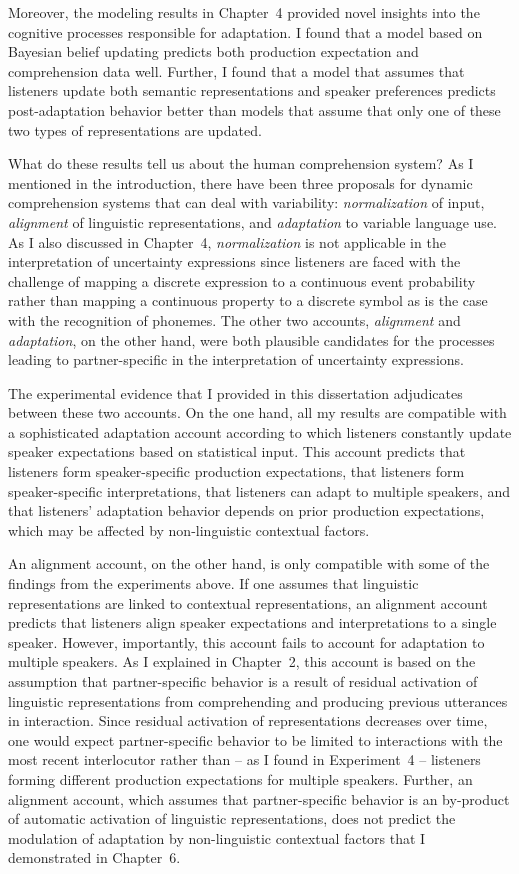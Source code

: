 Moreover, the modeling results in Chapter~4 provided novel insights into the cognitive processes responsible for adaptation. I found that a model based on Bayesian belief updating predicts both production expectation and comprehension data well. Further, I found that a model that assumes that listeners update both semantic representations and speaker preferences predicts post-adaptation behavior better than models that assume that only one of these two types of representations are updated.

What do these results tell us about the human comprehension system? As I mentioned in the introduction, there have been three proposals for dynamic comprehension systems that can deal with variability: \textit{normalization} of input, \textit{alignment} of linguistic representations, and \textit{adaptation} to variable language use. As I also discussed in Chapter~4, \textit{normalization} is not applicable in the interpretation of uncertainty expressions since listeners are faced with the challenge of mapping a discrete expression to a continuous event probability rather than mapping a continuous property to a discrete symbol as is the case with the recognition of phonemes. The other two accounts, \textit{alignment} and \textit{adaptation}, on the other hand, were both plausible candidates for the processes leading to partner-specific in the interpretation of uncertainty expressions.

The experimental evidence that I provided in this dissertation adjudicates between these two accounts. On the one hand, all my results are compatible with a sophisticated adaptation account according to which listeners constantly update speaker expectations based on statistical input. This account predicts that listeners form speaker-specific production expectations, that listeners form speaker-specific interpretations, that listeners can adapt to multiple speakers, and that listeners' adaptation behavior depends on prior production expectations, which may be affected by non-linguistic contextual factors.

An alignment account, on the other hand, is only compatible with some of the findings from the experiments above. If one assumes that linguistic representations are linked to contextual representations,  an alignment account predicts that listeners align speaker expectations and interpretations to a single speaker. However, importantly, this account fails to account for adaptation to multiple speakers. As I explained in Chapter~2, this account is based on the assumption that partner-specific behavior is a result of residual activation of linguistic representations from comprehending and producing previous utterances in interaction. Since residual activation  of representations decreases over time, one would expect partner-specific behavior to be limited to interactions with the most recent interlocutor rather than -- as I found in Experiment~4 -- listeners forming different production expectations for multiple speakers. Further, an alignment account, which assumes that partner-specific behavior is an by-product of automatic activation of linguistic representations, does not predict the modulation of adaptation by non-linguistic contextual factors that I demonstrated in Chapter~6. 

